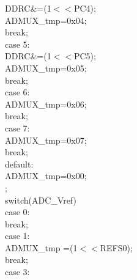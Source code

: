 \documentclass[titlepage, a4paper, 10pt, reqno, openany]{report}
\begin{document}
\begin{minipage}[t]{.3\linewidth}
	\hspace*{1.5cm}			DDRC\&=\texttildelow (1$<<$PC4); \\
	\hspace*{.5cm}			ADMUX\_tmp=0x04; \\
	\hspace*{1.5cm}			break; \\
	\hspace*{1cm}		case 5: \\
	\hspace*{1.5cm}			DDRC\&=\texttildelow (1$<<$PC5); \\
	\hspace*{1.5cm}			ADMUX\_tmp=0x05; \\
	\hspace*{1.5cm}			break; \\
	\hspace*{1cm}		case 6: \\
	\hspace*{1.5cm}			ADMUX\_tmp=0x06; \\
	\hspace*{1.5cm}			break; \\
	\hspace*{1cm}		case 7: \\
	\hspace*{1.5cm}			ADMUX\_tmp=0x07; \\
	\hspace*{1.5cm}			break; \\
	\hspace*{1cm}		default: \\
	\hspace*{1.5cm}			ADMUX\_tmp=0x00; \\
	\hspace*{.5cm}	\textbraceright ; \\
	\hspace*{.5cm}	switch(ADC\_Vref)\textbraceleft \\
	\hspace*{1cm}		case 0: \\
	\hspace*{1.5cm}			break; \\
	\hspace*{1cm}		case 1: \\
	\hspace*{1.5cm}			ADMUX\_tmp \textbar =(1$<<$REFS0); \\
	\hspace*{1.5cm}			break; \\
	\hspace*{1cm}		case 3: \\

\end{minipage}
\end{document}
